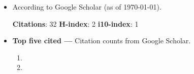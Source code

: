 \newif\ifshowpubsummary
\showpubsummarytrue %

\newif\ifshowsubmittedpubs

\newif\ifshowacceptedpubs

\nocite{*}
\ifshowpubsummary
{}
    \begin{itemize}
        \item [ ]
            \begin{minipage}[t]{0.75\textwidth}
                According to Google Scholar (as of \today).
            \end{minipage}
            \begin{minipage}[t]{0.18\textwidth}
            \begin{flushright}
                {\bf Citations}: 32
                {\bf H-index}: 2
                {\bf i10-index}: 1
            \end{flushright}
            \end{minipage}
        \item [ ]
            {\bf Top five cited ---}
            Citation counts from Google Scholar.
            \begin{enumerate}
                \item {}
                \item {}
            \end{enumerate}
    \end{itemize}
\else %
\fi

\ifshowsubmittedpubs
\subsectiontitle{Submitted Publications}
\printbibliography[keyword=submitted, heading=none]
\else %
\fi

\ifshowacceptedpubs
\subsectiontitle{Accepted Publications}
\printbibliography[keyword=accepted, heading=none]
\else %
\fi

\printbibliography[keyword=refereed, heading=none]
